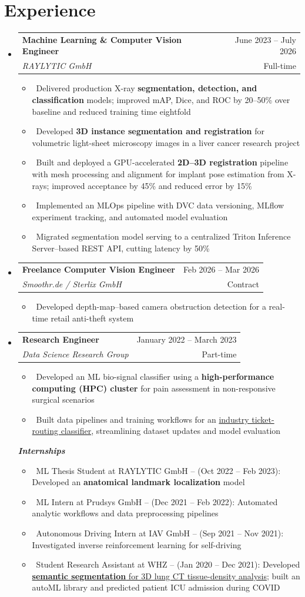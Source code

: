 \documentclass[letterpaper,10pt]{article}
\makeatletter
\newcommand{\resumeItem}[1]{
    \item\small{#1}\vspace{-0.5pt}
}
\newcommand{\resumeSubheading}[4]{
\vspace{2pt}\item
  \begin{tabular*}{0.97\textwidth}[t]{l@{\extracolsep{\fill}}r}
    \textbf{#1} & #2 \\
    \textit{{#3}} & {#4} \\
  \end{tabular*}\vspace{-0pt}
}
\newcommand{\resumeSubHeadingList}{\begin{itemize}[leftmargin=0.15in, label={}]\vspace{-2pt}}
\newcommand{\resumeSubHeadingListEnd}{\end{itemize}}
\makeatother
\begin{document}
\section{Experience}
\resumeSubHeadingList
  \resumeSubheading
      {Machine Learning \& Computer Vision Engineer}{June 2023 -- July 2026}
      {RAYLYTIC GmbH}{Full-time}
      \resumeSubHeadingList
          \resumeItem{\textbullet\ Delivered production X-ray \textbf{segmentation, detection, and classification} models; improved mAP, Dice, and ROC by 20--50\% over baseline and reduced training time eightfold}
          \resumeItem{\textbullet\ Developed \textbf{3D instance segmentation and registration} for volumetric light-sheet microscopy images in a liver cancer research project}
          \resumeItem{\textbullet\ Built and deployed a GPU-accelerated \textbf{2D--3D registration} pipeline with mesh processing and alignment for implant pose estimation from X-rays; improved acceptance by 45\% and reduced error by 15\%}
          \resumeItem{\textbullet\ Implemented an MLOps pipeline with DVC data versioning, MLflow experiment tracking, and automated model evaluation}
          \resumeItem{\textbullet\ Migrated segmentation model serving to a centralized Triton Inference Server--based REST API, cutting latency by 50\%}
      \resumeSubHeadingListEnd
  
  \resumeSubheading
      {Freelance Computer Vision Engineer}{Feb 2026 -- Mar 2026}
      {Smoothr.de / Sterlix GmbH}{Contract}
      \resumeSubHeadingList
          \resumeItem{\textbullet\ Developed depth-map--based camera obstruction detection for a real-time retail anti-theft system}
      \resumeSubHeadingListEnd
      
  \resumeSubheading
      {Research Engineer}{January 2022 -- March 2023}
      {Data Science Research Group}{Part-time}
      \resumeSubHeadingList
          \resumeItem{\textbullet\ Developed an ML bio-signal classifier using a \textbf{high-performance computing (HPC) cluster} for pain assessment in non-responsive surgical scenarios}
          \resumeItem{\textbullet\ Built data pipelines and training workflows for an \href{https://infai.org/projekt-kmi/}{industry ticket-routing classifier}, streamlining dataset updates and model evaluation}
      \resumeSubHeadingListEnd

  \textit{\textbf{Internships}}
  \resumeSubHeadingList
      \resumeItem{\textbullet\ {ML Thesis Student at RAYLYTIC GmbH} -- (Oct 2022 -- Feb 2023): Developed an \textbf{anatomical landmark localization} model}
      \resumeItem{\textbullet\ {ML Intern at Prudsys GmbH} -- (Dec 2021 -- Feb 2022): Automated analytic workflows and data preprocessing pipelines}
      \resumeItem{\textbullet\ {Autonomous Driving Intern at IAV GmbH} -- (Sep 2021 -- Nov 2021): Investigated inverse reinforcement learning for self-driving}
      \resumeItem{\textbullet\ {Student Research Assistant at WHZ} -- (Jan 2020 -- Dec 2021): Developed \href{https://www.youtube.com/watch?v=Xa7rivGy6WQ}{\textbf{semantic segmentation} for 3D lung CT tissue-density analysis}; built an autoML library and predicted patient ICU admission during COVID}
  \resumeSubHeadingListEnd
\resumeSubHeadingListEnd
\end{document}
